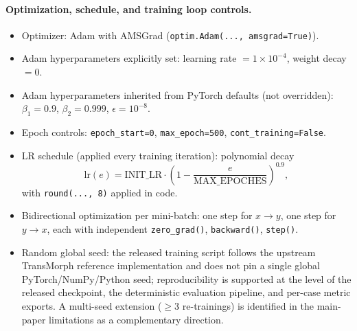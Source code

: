 \documentclass[11pt,a4paper]{article}
\begin{document}
\paragraph{Optimization, schedule, and training loop controls.}
\begin{itemize}
\item Optimizer: Adam with AMSGrad (\texttt{optim.Adam(..., amsgrad=True)}).
\item Adam hyperparameters explicitly set: learning rate \(=1\times10^{-4}\), weight decay \(=0\).
\item Adam hyperparameters inherited from PyTorch defaults (not overridden): \(\beta_1=0.9\), \(\beta_2=0.999\), \(\epsilon=10^{-8}\).
\item Epoch controls: \texttt{epoch\_start=0}, \texttt{max\_epoch=500}, \texttt{cont\_training=False}.
\item LR schedule (applied every training iteration): polynomial decay
\[
\mathrm{lr}(e)=\mathrm{INIT\_LR}\cdot\left(1-\frac{e}{\mathrm{MAX\_EPOCHES}}\right)^{0.9},
\]
with \texttt{round(..., 8)} applied in code.
\item Bidirectional optimization per mini-batch: one step for \(x\rightarrow y\), one step for \(y\rightarrow x\), each with independent \texttt{zero\_grad()}, \texttt{backward()}, \texttt{step()}.
\item Random global seed: the released training script follows the upstream TransMorph reference implementation and does not pin a single global PyTorch/NumPy/Python seed; reproducibility is supported at the level of the released checkpoint, the deterministic evaluation pipeline, and per-case metric exports. A multi-seed extension (\(\geq 3\) re-trainings) is identified in the main-paper limitations as a complementary direction.
\end{itemize}
\end{document}
